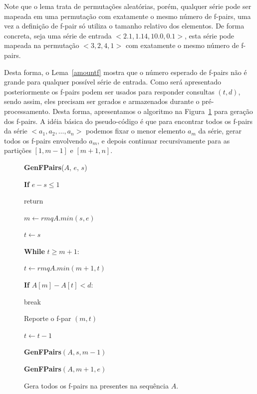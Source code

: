 \documentclass[12pt]{article}
\begin{document}



Note que o lema trata de permutações aleatórias, porém, qualquer série
pode ser mapeada em uma permutação com exatamente o mesmo número de f-pairs,
uma vez a definição de f-pair só utiliza o tamanho relativo dos elementos.
De forma concreta, seja uma série de entrada $<2.1, 1.14, 10.0, 0.1>$, 
esta série pode mapeada na permutação $<3, 2, 4, 1>$ com exatamente o mesmo número de
f-pairs.

Desta forma, o Lema~\ref{amountf} mostra que o número esperado de f-pairs não é grande
para qualquer possível série de entrada. Como será apresentado posteriormente os f-pairs podem ser usados para responder
consultas $(t, d)$, sendo assim, eles precisam ser gerados e armazenados
durante o pré-processamento. Desta forma, apresentamos o algoritmo na Figura~\ref{gemfpair} para geração
dos f-pairs. A idéia básica do pseudo-código é que para encontrar todos os f-pairs da
série $<a_1, a_2, \ldots, a_n>$ podemos fixar o menor elemento $a_m$ da série,
gerar todos os f-pairs envolvendo $a_m$, e depois continuar recursivamente para as partições $[1, m - 1]$ e $[m + 1, n]$.

\clearpage
\begin{figure}
\begin{framed}
{\bf GenFPairs}($A$, $e$, $s$)

\hspace{1cm} {\bf If} $e - s \le 1$

\hspace{2cm} return

\hspace{1cm} $m \leftarrow rmqA.min(s, e)$

\hspace{1cm} $t \leftarrow s$

\hspace{1cm} {\bf While} $t \ge m + 1$:

\hspace{2cm} $t \leftarrow rmqA.min(m + 1, t)$

\hspace{2cm} {\bf If} $A[m] - A[t] < d$:

\hspace{3cm} break

\hspace{2cm} Reporte o f-par $(m, t)$

\hspace{2cm} $t \leftarrow t - 1$

\hspace{1cm} {\bf GenFPairs}$(A, s, m - 1)$

\hspace{1cm} {\bf GenFPairs}$(A, m + 1, e)$

\end{framed}
\caption{Gera todos os f-pairs na presentes na sequência $A$.}
\label{gemfpair}
\end{figure}
\end{document}
